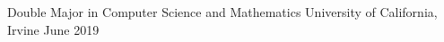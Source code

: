 \begin{cventries}
  \cventry
    {Double Major in Computer Science and Mathematics}
    {University of California, Irvine}
    {}
    {June 2019}
    {}
\end{cventries}
\vspace{-3.0mm}